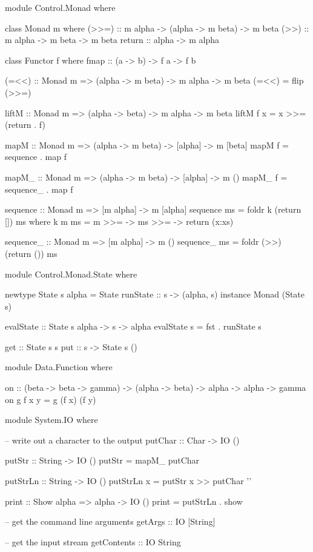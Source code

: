 \begin{code}
module Control.Monad where

class Monad m where
		(>>=) :: m alpha -> (alpha -> m beta) -> m beta
		(>>) :: m alpha -> m beta -> m beta
		return :: alpha -> m alpha

class Functor f where
	  fmap :: (a -> b) -> f a -> f b

(=<<) :: Monad m => (alpha -> m beta) -> m alpha -> m beta
(=<<) = flip (>>=)

liftM :: Monad m => (alpha -> beta) -> m alpha -> m beta
liftM f x = x >>= (return . f)

mapM :: Monad m => (alpha -> m beta) -> [alpha] -> m [beta]
mapM f = sequence . map f

mapM_ :: Monad m => (alpha -> m beta) -> [alpha] -> m ()
mapM_ f = sequence_ . map f

sequence :: Monad m => [m alpha] -> m [alpha]
sequence ms = foldr k (return []) ms
	where k m ms = m >>= \x -> ms >>= \xs -> return (x:xs)

sequence_ :: Monad m => [m alpha] -> m ()
sequence_ ms = foldr (>>) (return ()) ms
\end{code}

\begin{code}
module Control.Monad.State where

newtype State s alpha = State {runState :: s -> (alpha, s)}
instance Monad (State s)

evalState :: State s alpha -> s -> alpha
evalState s = fst . runState s

get :: State s s
put :: s -> State s ()
\end{code}

\begin{code}
module Data.Function where

on :: (beta -> beta -> gamma) -> (alpha -> beta) -> alpha -> alpha -> gamma
on g f x y = g (f x) (f y)
\end{code}

\begin{code}
module System.IO where

-- write out a character to the output
putChar :: Char -> IO ()

putStr :: String -> IO ()
putStr = mapM_ putChar

putStrLn :: String -> IO ()
putStrLn x = putStr x >> putChar '\n'

print :: Show alpha => alpha -> IO ()
print = putStrLn . show

-- get the command line arguments
getArgs :: IO [String]

-- get the input stream
getContents :: IO String
\end{code}


